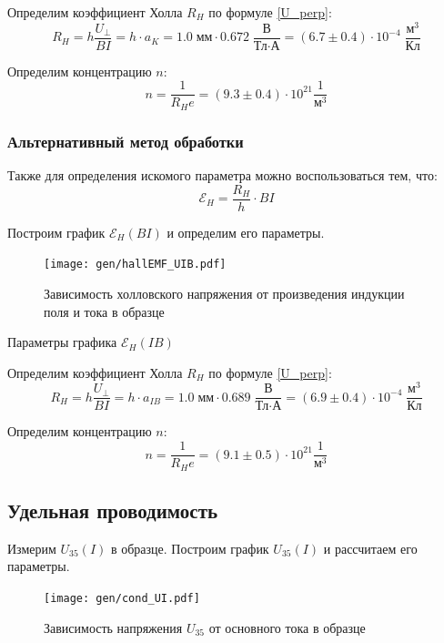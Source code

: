 \documentclass[12pt,a4paper]{article}
\begin{document}
	Определим коэффициент Холла $R_H$ по формуле \eqref{U_perp}:
	$$ R_H = h \frac{U_\perp}{BI} = h \cdot a_K = 1.0 \; \text{мм} \cdot 0.672 \; \frac{\text{В}}{\text{Тл} \cdot \text{А}} = (6.7 \pm 0.4) \cdot 10^{-4} \; \frac{\text{м}^3}{\text{Кл}} $$
	
	Определим концентрацию $n$:
	$$ n = \frac{1}{R_H e} = (9.3 \pm 0.4) \cdot 10^{21} \frac{1}{\text{м}^3} $$
	
	\subsubsection*{Альтернативный метод обработки}
	
	Также для определения искомого параметра можно воспользоваться тем, что:
	$$ \mathcal{E}_H = \frac{R_H}{h} \cdot BI $$
	
	Построим график $\mathcal{E}_H (BI)$ и определим его параметры.
	
	\begin{figure}[H]
		\texttt{[image: gen/hallEMF\_UIB.pdf]}
		\caption{Зависимость холловского напряжения от произведения индукции поля и тока в образце}
	\end{figure}
	
	\begin{table}[h]
		\caption{Параметры графика $\mathcal{E}_H (IB)$}
		
	\end{table}

	Определим коэффициент Холла $R_H$ по формуле \eqref{U_perp}:
	$$ R_H = h \frac{U_\perp}{BI} = h \cdot a_{IB} = 1.0 \; \text{мм} \cdot 0.689 \; \frac{\text{В}}{\text{Тл} \cdot \text{А}} = (6.9 \pm 0.4) \cdot 10^{-4} \; \frac{\text{м}^3}{\text{Кл}} $$
	
	Определим концентрацию $n$:
	$$ n = \frac{1}{R_H e} = (9.1 \pm 0.5) \cdot 10^{21} \frac{1}{\text{м}^3} $$
	
	\subsection*{Удельная проводимость}
	
	Измерим $U_{35} (I)$ в образце. Построим график $U_{35} (I)$ и рассчитаем его параметры.
	
	
	\begin{figure}[H]
		\texttt{[image: gen/cond\_UI.pdf]}
		\caption{Зависимость напряжения $U_{35}$ от основного тока в образце}
	\end{figure}
	
\end{document}
